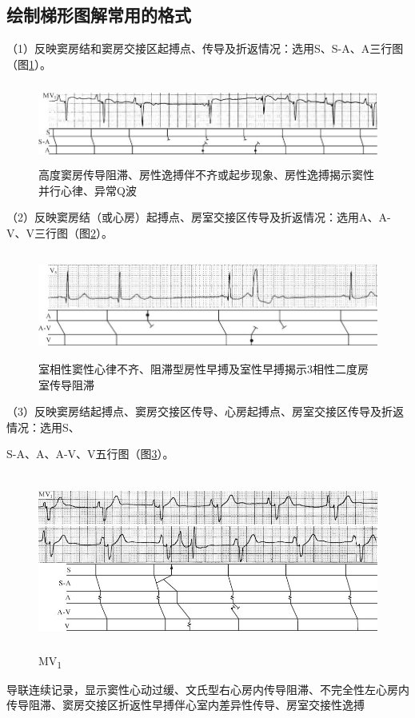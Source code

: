 \protect\hypertarget{text00017.htmlux5cux23subid123}{}{}

\subsection{绘制梯形图解常用的格式}

（1）反映窦房结和窦房交接区起搏点、传导及折返情况：选用S、S-A、A三行图（图\ref{fig10-1}）。

\begin{figure}[!htbp]
 \centering
 \includegraphics[width=5.76042in,height=1.04167in]{./images/Image00145.jpg}
 \captionsetup{justification=centering}
 \caption{高度窦房传导阻滞、房性逸搏伴不齐或起步现象、房性逸搏揭示窦性并行心律、异常Q波}
 \label{fig10-1}
  \end{figure} 

（2）反映窦房结（或心房）起搏点、房室交接区传导及折返情况：选用A、A-V、V三行图（图\ref{fig10-2}）。

\begin{figure}[!htbp]
 \centering
 \includegraphics[width=5.75in,height=1.375in]{./images/Image00146.jpg}
 \captionsetup{justification=centering}
 \caption{室相性窦性心律不齐、阻滞型房性早搏及室性早搏揭示3相性二度房室传导阻滞}
 \label{fig10-2}
  \end{figure} 

（3）反映窦房结起搏点、窦房交接区传导、心房起搏点、房室交接区传导及折返情况：选用S、

S-A、A、A-V、V五行图（图\ref{fig10-3}）。

\begin{figure}[!htbp]
 \centering
 \includegraphics[width=5.5625in,height=2.29167in]{./images/Image00147.jpg}
 \captionsetup{justification=centering}
 \caption{MV\textsubscript{1}}
 \label{fig10-3}
  \end{figure} 
导联连续记录，显示窦性心动过缓、文氏型右心房内传导阻滞、不完全性左心房内传导阻滞、窦房交接区折返性早搏伴心室内差异性传导、房室交接性逸搏

